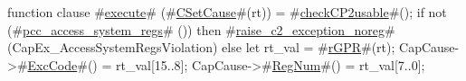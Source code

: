 function clause #\hyperref[zexecute]{execute}# (#\hyperref[zCSetCause]{CSetCause}#(rt)) = 
{
  #\hyperref[zcheckCP2usable]{checkCP2usable}#();
  if not (#\hyperref[zpcczyaccesszysystemzyregs]{pcc\_access\_system\_regs}# ()) then
    #\hyperref[zraisezyc2zyexceptionzynoreg]{raise\_c2\_exception\_noreg}#(CapEx_AccessSystemRegsViolation)
  else
  {
    let rt_val = #\hyperref[zrGPR]{rGPR}#(rt);
    CapCause->#\hyperref[zExcCode]{ExcCode}#() = rt_val[15..8];
    CapCause->#\hyperref[zRegNum]{RegNum}#()  = rt_val[7..0];
  }
}

